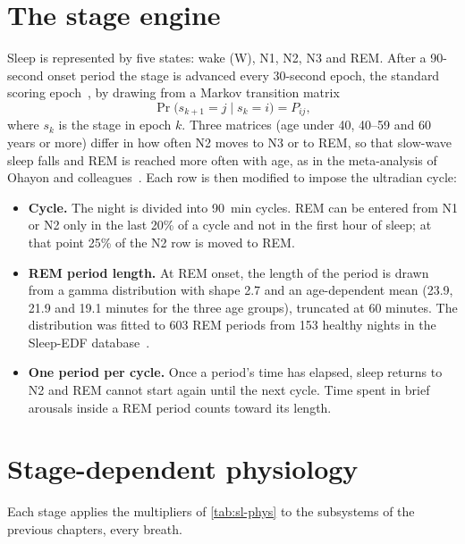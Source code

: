 \section{The stage engine}
\label{sec:sl-engine}
Sleep is represented by five states: wake (W), N1, N2, N3 and REM. After a 90-second onset period the stage is advanced every 30-second epoch, the standard scoring epoch~\citep{berry2012}, by drawing from a Markov transition matrix
\begin{equation}
\Pr\bigl(s_{k+1} = j \mid s_k = i\bigr) = P_{ij},
\label{eq:sl-markov}
\end{equation}
where $s_k$ is the stage in epoch $k$. Three matrices (age under 40, 40--59 and 60 years or more) differ in how often N2 moves to N3 or to REM, so that slow-wave sleep falls and REM is reached more often with age, as in the meta-analysis of Ohayon and colleagues~\citep{ohayon2004}. Each row is then modified to impose the ultradian cycle:
\begin{itemize}[leftmargin=*]
  \item \textbf{Cycle.} The night is divided into \SI{90}{\minute} cycles. REM can be entered from N1 or N2 only in the last 20\% of a cycle and not in the first hour of sleep; at that point 25\% of the N2 row is moved to REM.
  \item \textbf{REM period length.} At REM onset, the length of the period is drawn from a gamma distribution with shape 2.7 and an age-dependent mean (23.9, 21.9 and 19.1 minutes for the three age groups), truncated at 60 minutes. The distribution was fitted to 603 REM periods from 153 healthy nights in the Sleep-EDF database~\citep{kemp2000}.
  \item \textbf{One period per cycle.} Once a period's time has elapsed, sleep returns to N2 and REM cannot start again until the next cycle. Time spent in brief arousals inside a REM period counts toward its length.
\end{itemize}

\section{Stage-dependent physiology}
\label{sec:sl-phys}
Each stage applies the multipliers of \cref{tab:sl-phys} to the subsystems of the previous chapters, every breath.

